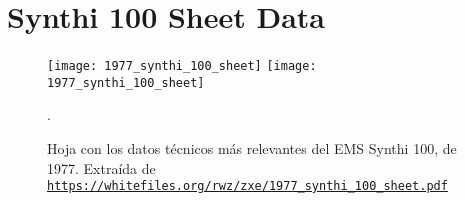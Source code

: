  \chapter[Synthi 100 sheet]{Synthi 100 Sheet Data}



\begin{figure}
	\centering
	\texttt{[image: 1977\_synthi\_100\_sheet]}
	\texttt{[image: 1977\_synthi\_100\_sheet]}
	\caption[EMS Synthi 100 \textit{Data Sheet}]{Hoja con los datos técnicos más relevantes del EMS Synthi 100, de 1977.  Extraída de\\ \href{https://whitefiles.org/rwz/zxe/1977\_synthi\_100\_sheet.pdf}{\texttt{https://whitefiles.org/rwz/zxe/1977\_synthi\_100\_sheet.pdf}}}.
	\label{fig:synthi100_sheet}
\end{figure}